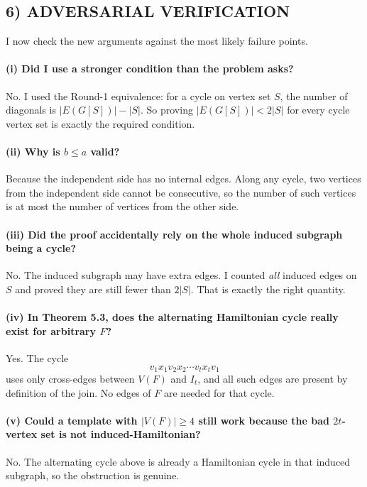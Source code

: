 \subsection*{6) ADVERSARIAL VERIFICATION}
I now check the new arguments against the most likely failure points.

\paragraph{(i) Did I use a stronger condition than the problem asks?}
No. I used the Round-1 equivalence:
for a cycle on vertex set $S$, the number of diagonals is $|E(G[S])|-|S|$.
So proving $|E(G[S])|<2|S|$ for every cycle vertex set is exactly the required condition.

\paragraph{(ii) Why is $b\le a$ valid?}
Because the independent side has no internal edges. Along any cycle, two vertices from the independent side cannot be consecutive, so the number of such vertices is at most the number of vertices from the other side.

\paragraph{(iii) Did the proof accidentally rely on the whole induced subgraph being a cycle?}
No. The induced subgraph may have extra edges. I counted \emph{all} induced edges on $S$ and proved they are still fewer than $2|S|$.
That is exactly the right quantity.

\paragraph{(iv) In Theorem 5.3, does the alternating Hamiltonian cycle really exist for arbitrary $F$?}
Yes. The cycle
\[
v_1x_1v_2x_2\cdots v_tx_tv_1
\]
uses only cross-edges between $V(F)$ and $I_t$, and all such edges are present by definition of the join. No edges of $F$ are needed for that cycle.

\paragraph{(v) Could a template with $|V(F)|\ge 4$ still work because the bad $2t$-vertex set is not induced-Hamiltonian?}
No. The alternating cycle above is already a Hamiltonian cycle in that induced subgraph, so the obstruction is genuine.

